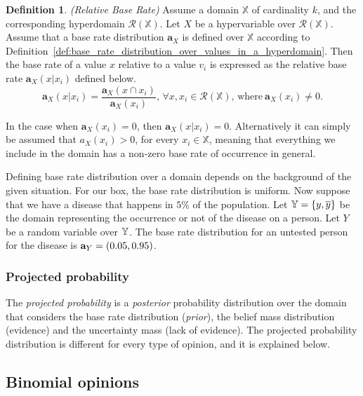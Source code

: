 \documentclass[a4paper,12pt]{article}
\theoremstyle{definition}
\newtheorem{definition}{Definition}[section]
\numberwithin{equation}{section}
\begin{document}
\begin{definition}
	\emph{(Relative Base Rate)} Assume a domain $\mathbb{X}$ of cardinality $k$, and the corresponding hyperdomain $\mathcal{R}(\mathbb{X})$. Let $X$ be a hypervariable over $\mathcal{R}(\mathbb{X})$. Assume that a base rate distribution $\mathbf{a}_X$ is defined over $\mathbb{X}$ according to Definition~\ref{def:base_rate_distribution_over_values_in_a_hyperdomain}. Then the base rate of a value $x$ relative to a value $v_i$ is expressed as the relative base rate $\mathbf{a}_X(x|x_i)$ defined below.
	\begin{equation}
		\mathbf{a}_X(x|x_i) = \dfrac{\mathbf{a}_X(x \cap x_i)}{\mathbf{a}_X(x_i)}\text{, } \forall x, x_i \in \mathcal{R}(\mathbb{X}) \text{, where}\ \mathbf{a}_X(x_i) \neq 0\text{.}
	\end{equation}

	In the case when $\mathbf{a}_X(x_i) = 0$, then $\mathbf{a}_X(x|x_i) = 0$. Alternatively it can simply be assumed that $a_X(x_i) > 0$, for every $x_i \in \mathbb{X}$, meaning that everything we include in the domain has a non-zero base rate of occurrence in general.
\end{definition}

Defining base rate distribution over a domain depends on the background of the given situation. For our box, the base rate distribution is uniform. Now suppose that we have a disease that happens in $5\%$ of the population. Let $\mathbb{Y} = \{y, \overline{y}\}$ be the domain representing the occurrence or not of the disease on a person. Let $Y$ be a random variable over $\mathbb{Y}$. The base rate distribution for an untested person for the disease is $\mathbf{a}_{Y} = (0.05, 0.95)$.

\subsubsection{Projected probability}

The \emph{projected probability} is a \emph{posterior} probability distribution over the domain that considers the base rate distribution (\emph{prior}), the belief mass distribution (evidence) and the uncertainty mass (lack of evidence). The projected probability distribution is different for every type of opinion, and it is explained below.

\subsection{Binomial opinions}
\end{document}
